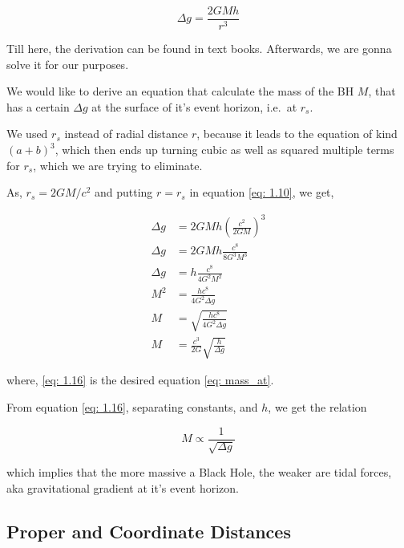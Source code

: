 \documentclass[9pt,a4paper,twocolumn,twoside]{tau-class/tau}
\begin{document}
  \begin{equation} \label{eq: 1.10}
    \Delta g = \frac{2GMh}{r^{3}} \tag{1.10}
  \end{equation}

  Till here, the derivation can be found in text books. Afterwards, we are gonna solve it for our purposes. 

  We would like to derive an equation that calculate the mass of the BH \(M\), that has a certain \(\Delta g\) at the surface of it's event horizon, i.e.~at \(r_s\). 

  \begin{note}
    We used \(r_s\) instead of radial distance \(r\), because it leads to the equation of kind \((a+b)^3\), which then ends up turning cubic as well as squared multiple terms for \(r_s\), which we are trying to eliminate.
  \end{note}

  As, \(r_s = 2GM/c^2 \) and putting \(r = r_s\) in equation \eqref{eq: 1.10}, we get, 

  \begin{align} \label{eq: 1.16}
    \Delta g &= 2GMh (\frac{c^2}{2GM})^3 \tag{1.11} \\
    \Delta g &= 2GMh \frac{c^8}{8G^3 M^3} \tag{1.12} \\
    \Delta g &= h \frac{c^8}{4G^2 M^2} \tag{1.13} \\
     M^2 &=  \frac{hc^8}{4G^2 \Delta g} \tag{1.14} \\
     M &= \sqrt{\frac{hc^8}{4G^2 \Delta g} \tag{1.15}} \\
     M &= \frac{c^3}{2G}\sqrt{\frac{h}{\Delta g} \tag{1.16}}  
  \end{align}

  where, \eqref{eq: 1.16} is the desired equation \eqref{eq: mass_at}.
  
  \begin{info}
    From equation \eqref{eq: 1.16}, separating constants, and \(h\), we get the relation

    \begin{equation*}
      M \propto \frac{1}{\sqrt{\Delta g}}
    \end{equation*}
    
    which implies that the more massive a Black Hole, the weaker are tidal forces, aka gravitational gradient at it's event horizon. 
  \end{info}

  \subsection*{Proper and Coordinate Distances}
\end{document}
